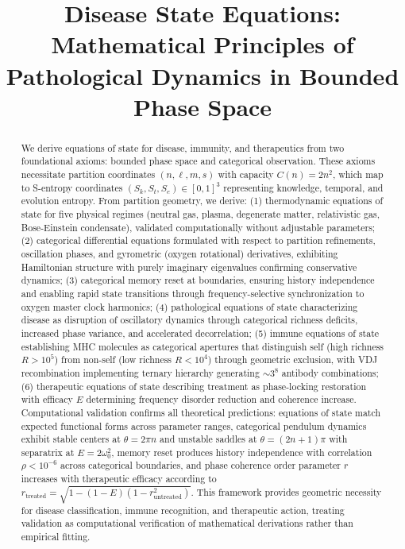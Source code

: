 \documentclass[12pt,a4paper]{article}
\title{Disease State Equations: Mathematical Principles of Pathological Dynamics in Bounded Phase Space}
\author{}
\date{}
\theoremstyle{definition}
\theoremstyle{remark}
\newcommand{\Sk}{S_k}
\newcommand{\St}{S_t}
\newcommand{\Se}{S_e}
\begin{document}
\maketitle

\begin{abstract}
We derive equations of state for disease, immunity, and therapeutics from two foundational axioms: bounded phase space and categorical observation. These axioms necessitate partition coordinates $(n,\ell,m,s)$ with capacity $C(n) = 2n^2$, which map to S-entropy coordinates $(\Sk,\St,\Se) \in [0,1]^3$ representing knowledge, temporal, and evolution entropy. From partition geometry, we derive: (1) thermodynamic equations of state for five physical regimes (neutral gas, plasma, degenerate matter, relativistic gas, Bose-Einstein condensate), validated computationally without adjustable parameters; (2) categorical differential equations formulated with respect to partition refinements, oscillation phases, and gyrometric (oxygen rotational) derivatives, exhibiting Hamiltonian structure with purely imaginary eigenvalues confirming conservative dynamics; (3) categorical memory reset at boundaries, ensuring history independence and enabling rapid state transitions through frequency-selective synchronization to oxygen master clock harmonics; (4) pathological equations of state characterizing disease as disruption of oscillatory dynamics through categorical richness deficits, increased phase variance, and accelerated decorrelation; (5) immune equations of state establishing MHC molecules as categorical apertures that distinguish self (high richness $R > 10^5$) from non-self (low richness $R < 10^4$) through geometric exclusion, with VDJ recombination implementing ternary hierarchy generating $\sim 3^8$ antibody combinations; (6) therapeutic equations of state describing treatment as phase-locking restoration with efficacy $E$ determining frequency disorder reduction and coherence increase. Computational validation confirms all theoretical predictions: equations of state match expected functional forms across parameter ranges, categorical pendulum dynamics exhibit stable centers at $\theta = 2\pi n$ and unstable saddles at $\theta = (2n+1)\pi$ with separatrix at $E = 2\omega_0^2$, memory reset produces history independence with correlation $\rho < 10^{-6}$ across categorical boundaries, and phase coherence order parameter $r$ increases with therapeutic efficacy according to $r_{\mathrm{treated}} = \sqrt{1 - (1-E)(1-r_{\mathrm{untreated}}^2)}$. This framework provides geometric necessity for disease classification, immune recognition, and therapeutic action, treating validation as computational verification of mathematical derivations rather than empirical fitting.
\end{abstract}
\end{document}
